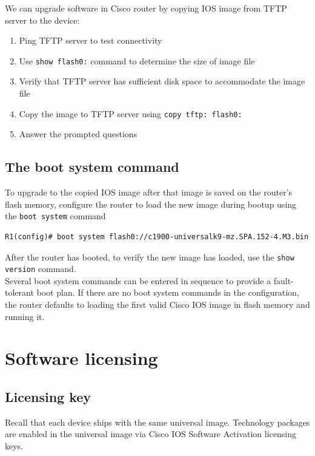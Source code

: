 We can upgrade software in Cisco router by copying IOS image from TFTP server to the device:

\begin{enumerate}
\item Ping TFTP server to test connectivity
\item Use \verb|show flash0:| command to determine the size of image file
\item Verify that TFTP server has sufficient disk space to accommodate the image file
\item Copy the image to TFTP server using \verb|copy tftp: flash0:|
\item Answer the prompted questions
\end{enumerate}

\subsection{The boot system command}

To upgrade to the copied IOS image after that image is saved on the router's flash memory, configure the router to load the new image during bootup using the \verb|boot system| command

\begin{verbatim}
R1(config)# boot system flash0://c1900-universalk9-mz.SPA.152-4.M3.bin
\end{verbatim}

After the router has booted, to verify the new image has loaded, use the \verb|show version| command.\\

Several boot system commands can be entered in sequence to provide a fault-tolerant boot plan. If there are no boot system commands in the configuration, the router defaults to loading the first valid Cisco IOS image in flash memory and running it.

\section{Software licensing}

\subsection{Licensing key}

Recall that each device ships with the same universal image. Technology packages are enabled in the
universal image via Cisco IOS Software Activation licensing keys. \\

